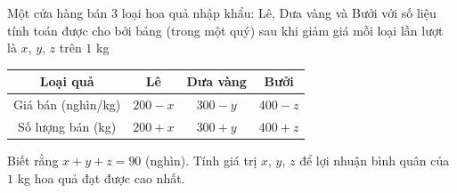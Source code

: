 \begin{ex}%
	Một cửa hàng bán $3$ loại hoa quả nhập khẩu: Lê, Dưa vàng và Bưởi với số liệu tính toán được cho bởi bảng (trong một quý)  sau khi giảm giá mỗi loại lần lượt là $x$, $y$, $z$ trên $1$ kg
	\begin{center}
		\begin{tabular}{|c|c|c|c|}
			\hline Loại quả&Lê&Dưa  vàng&Bưởi\\
			 \hline Giá bán (nghìn/kg)&$200-x$&$300-y$&$400-z$\\
			\hline Số lượng  bán (kg)&$200+x$&$300+y$&$400+z$\\
			\hline 
		\end{tabular}
	\end{center}
	Biết rằng $x+y+z=90$ (nghìn). Tính giá trị  $x$, $y$, $z$ để lợi nhuận bình quân của $1$ kg hoa quả đạt được cao nhất.
\end{ex}

